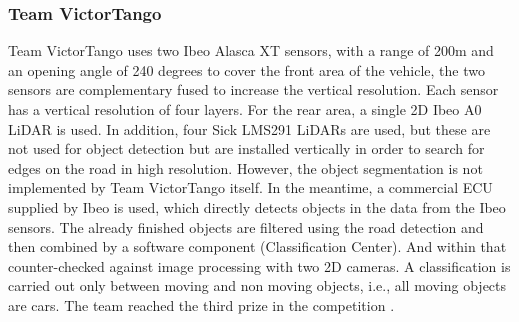 \documentclass[11pt,oneside,openright]{mpreport}
\begin{document}
\subsubsection{Team VictorTango}

Team VictorTango \cite{Atreya2007} uses two Ibeo Alasca XT sensors, with a range of 200m and an opening angle of 240 degrees to cover the front area of the vehicle, 
the two sensors are complementary fused to increase the vertical resolution. Each sensor has a vertical resolution of four layers. For the rear area, a single 2D Ibeo A0 LiDAR is used. 
In addition, four Sick LMS291 LiDARs are used, but these are not used for object detection but are installed vertically in order to search for edges on the road in high resolution.
However, the object segmentation is not implemented by Team VictorTango itself. In the meantime, a commercial ECU supplied by Ibeo is used, which directly detects objects in the data from the Ibeo sensors.
The already finished objects are filtered using the road detection and then combined by a software component (Classification Center). And within that counter-checked against image processing
with two 2D cameras. A classification is carried out only between moving and non moving objects, i.e., all moving objects are cars. The team reached the third prize in the competition \cite{Release2007}.
\end{document}
